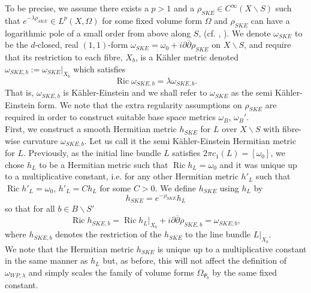 \documentclass[12pt]{article}
\numberwithin{equation}{section}
\renewcommand{\d}{\partial}
\newcommand{\dbar}{\overline{\partial}}
\DeclareMathOperator{\Ric}{Ric}
\begin{document}
\noindent To be precise, we assume there exists a $p > 1$ and a $\rho_{SKE} \in C^{\infty}(X\backslash S)$ such that $e^{-\lambda \rho_{SKE}} \in L^p(X,\Omega)$ for some fixed volume form $\Omega$ and $\rho_{SKE}$ can have a logarithmic pole of a small order from above along $S$, (cf. \cite[\S 3.1]{BBEGZ19}, \cite{CSYZ22}). We denote $\omega_{SKE}$ to be the $d$-closed, real $(1,1)$-form $\omega_{SKE} = \omega_0 + i\d\dbar \rho_{SKE}$ on $X \backslash S$, and require that its restriction to each fibre, $X_b$, is a K\"ahler metric denoted $\omega_{SKE,b} := \omega_{SKE}|_{X_b}$ which satisfies
\begin{equation*}
    \Ric \omega_{SKE,b} = \lambda \omega_{SKE,b}.
\end{equation*}
That is, $\omega_{SKE,b}$ is K\"ahler-Einstein and we shall refer to $\omega_{SKE}$ as the semi K\"ahler-Einstein form. We note that the extra regularity assumptions on $\rho_{SKE}$ are required in order to construct suitable base space metrics $\omega_B$, $\omega_B'$.\\

\noindent First, we construct a smooth Hermitian metric $h_{SKE}$ for $L$ over $X\backslash S$ with fibre-wise curvature $\omega_{SKE,b}$. Let us call it the semi K\"ahler-Einstein Hermitian metric for $L$. Previously, as the initial line bundle $L$ satisfies $2\pi c_1(L) = [\omega_0]$, we chose $h_L$ to be a Hermitian metric such that $\Ric h_L = \omega_0$ and it was unique up to a multiplicative constant, i.e. for any other Hermitian metric $h'_L$ such that $\Ric h'_L = \omega_0$, $h'_L = C h_L$ for some $C > 0$. We define $h_{SKE}$ using $h_L$ by
\begin{equation*}
    h_{SKE} = e^{-\rho_{SKE}} h_L
\end{equation*}
so that for all $b \in B \backslash S'$
\begin{equation*}
    \Ric h_{SKE,b} = \Ric h_L|_{X_b}  + i\d\dbar \rho_{SKE,b} = \omega_{SKE,b},
\end{equation*}
where $h_{SKE,b}$ denotes the restriction of the $h_{SKE}$ to the line bundle $L|_{X_b}$.\\
We note that the Hermitian metric $h_{SKE}$ is unique up to a multiplicative constant in the same manner as $h_L$ but, as before, this will not affect the definition of $\omega_{WP,\lambda}$ and simply scales the family of volume forms $\Omega_{\Psi_b}$ by the same fixed constant.\\
\end{document}
